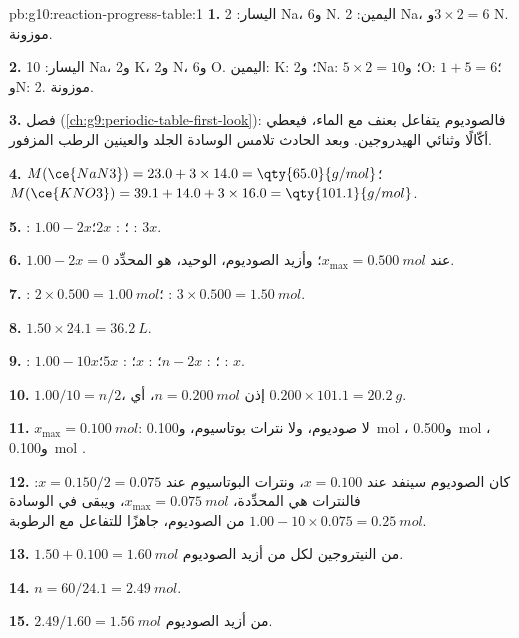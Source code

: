 \begin{solution}{pb:g10:reaction-progress-table:1}
\textbf{1.} اليسار: 2 Na، و6 N. اليمين: 2 Na، و$3 \times 2 = 6$ N. موزونة.

\textbf{2.} اليسار: 10 Na، و2 K، و2 N، و6 O. اليمين: K: 2؛ وNa: $5 \times 2 =
10$؛ وO: $1 + 5 = 6$؛ وN: 2. موزونة.

\textbf{3.} فصل  (\cref{ch:g9:periodic-table-first-look}):
فالصوديوم يتفاعل بعنف مع الماء، فيعطي  أكّالًا وثنائي
الهيدروجين. وبعد الحادث تلامس الوسادة الجلد والعينين  الرطب
المزفور.

\textbf{4.} $M(\ce{NaN3}) = 23.0 + 3 \times 14.0 = \qty{65.0}{g/mol}$؛
$M(\ce{KNO3}) = 39.1 + 14.0 + 3 \times 16.0 = \qty{101.1}{g/mol}$.

\textbf{5.} : $1.00 - 2x$؛ : $2x$؛ : $3x$.

\textbf{6.} $1.00 - 2x = 0$ عند $x_{\max} = \qty{0.500}{mol}$؛ وأزيد
الصوديوم،  الوحيد، هو المحدِّد.

\textbf{7.} : $2 \times 0.500 = \qty{1.00}{mol}$؛ :
$3 \times 0.500 = \qty{1.50}{mol}$.

\textbf{8.} $1.50 \times 24.1 = \qty{36.2}{L}$.

\textbf{9.} : $1.00 - 10x$؛ : $n - 2x$؛ : $x$؛
: $5x$؛ : $x$.

\textbf{10.} $1.00/10 = n/2$، إذن $n = \qty{0.200}{mol}$، أي
$0.200 \times 101.1 = \qty{20.2}{g}$.

\textbf{11.} $x_{\max} = \qty{0.100}{mol}$: لا صوديوم، ولا نترات بوتاسيوم،
و\qty{0.100}{mol} ، و\qty{0.500}{mol} ،
و\qty{0.100}{mol} .

\textbf{12.} كان الصوديوم سينفد عند $x = 0.100$، ونترات البوتاسيوم عند
$x = 0.150/2 = 0.075$: فالنترات هي المحدِّدة، $x_{\max} =
\qty{0.075}{mol}$، ويبقى في الوسادة $1.00 - 10 \times 0.075 = \qty{0.25}{mol}$
من  الصوديوم، جاهزًا للتفاعل مع الرطوبة.

\textbf{13.} $1.50 + 0.100 = \qty{1.60}{mol}$ من النيتروجين لكل  من
أزيد الصوديوم.

\textbf{14.} $n = 60 / 24.1 = \qty{2.49}{mol}$.

\textbf{15.} $2.49 / 1.60 = \qty{1.56}{mol}$ من أزيد الصوديوم.


\end{solution}
